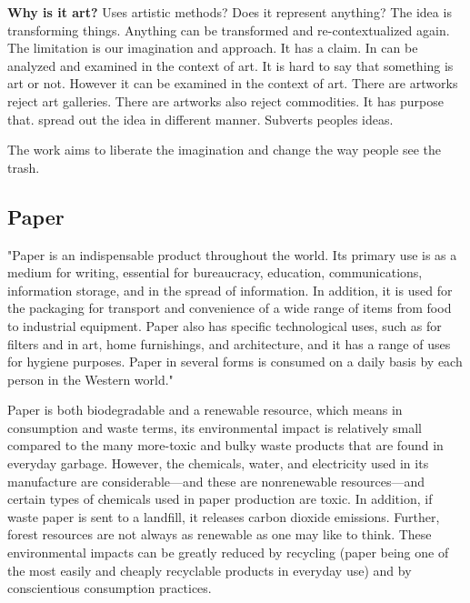 \textbf{Why is it art?} Uses artistic methods? Does it represent anything? The idea is transforming things. Anything can be transformed and re-contextualized again. The limitation is our imagination and approach. It has a claim. In can be analyzed and examined in the context of art. It is hard to say that something is art or not. However it can be examined in the context of art. There are artworks reject art galleries. There are artworks also reject commodities. It has purpose that. spread out the idea in different manner. Subverts peoples ideas. 

The work aims to liberate the imagination and change the way people see the trash.

\subsection{Paper}
"Paper is an indispensable product throughout the world. Its primary use is as a medium for writing, essential for bureaucracy, education, communications, information storage, and in the spread of information. In addition, it is used for the packaging for transport and convenience of a wide range of items from food to industrial equipment. Paper also has specific technological uses, such as for filters and in art, home furnishings, and architecture, and it has a range of uses for hygiene purposes. Paper in several forms is consumed on a daily basis by each person in the Western world." \cite{trafford2012paper}


Paper is both biodegradable and a renewable resource, which means in consumption and waste terms, its environmental impact is relatively small compared to the many more-toxic and bulky waste products that are found in everyday garbage. However, the chemicals, water, and electricity used in its manufacture are considerable---and these are nonrenewable resources---and certain types of chemicals used in paper production are toxic. In addition, if waste paper is sent to a landfill, it releases carbon dioxide emissions. Further, forest resources are not always as renewable as one may like to think. These environmental impacts can be greatly reduced by recycling (paper being one of the most easily and cheaply recyclable products in everyday use) and by conscientious consumption practices.

